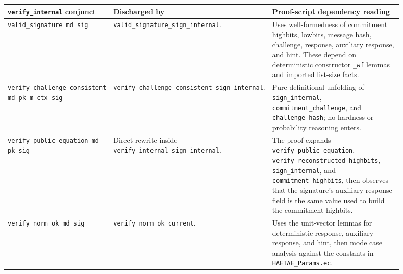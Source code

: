 \documentclass[11pt]{report}
\DeclareRobustCommand{\file}[1]{\ifmmode\text{\nolinkurl{#1}}\else\nolinkurl{#1}\fi}
\DeclareRobustCommand{\ec}[1]{\ifmmode\text{\nolinkurl{#1}}\else\nolinkurl{#1}\fi}
\theoremstyle{definition}
\theoremstyle{plain}
\begin{document}
\begin{longtable}{p{0.20\linewidth}p{0.33\linewidth}p{0.37\linewidth}}
\toprule
\textbf{\ec{verify\_internal} conjunct} & \textbf{Discharged by} &
\textbf{Proof-script dependency reading} \\
\midrule
\ec{valid\_signature md sig} &
\ec{valid\_signature\_sign\_internal}. &
Uses well-formedness of commitment highbits, lowbits, message hash, challenge,
response, auxiliary response, and hint.  These depend on deterministic
constructor \ec{\_wf} lemmas and imported list-size facts. \\
\midrule
\ec{verify\_challenge\_consistent md pk m ctx sig} &
\ec{verify\_challenge\_consistent\_sign\_internal}. &
Pure definitional unfolding of \ec{sign\_internal},
\ec{commitment\_challenge}, and \ec{challenge\_hash}; no hardness or
probability reasoning enters. \\
\midrule
\ec{verify\_public\_equation md pk sig} &
Direct rewrite inside \ec{verify\_internal\_sign\_internal}. &
The proof expands \ec{verify\_public\_equation},
\ec{verify\_reconstructed\_highbits}, \ec{sign\_internal}, and
\ec{commitment\_highbits}, then observes that the signature's auxiliary
response field is the same value used to build the commitment highbits. \\
\midrule
\ec{verify\_norm\_ok md sig} &
\ec{verify\_norm\_ok\_current}. &
Uses the unit-vector lemmas for deterministic response, auxiliary response,
and hint, then mode case analysis against the constants in
\file{HAETAE\_Params.ec}. \\
\bottomrule
\end{longtable}
\end{document}
